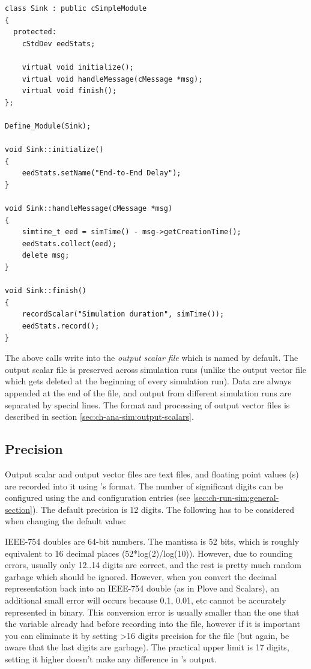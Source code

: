 \begin{verbatim}
class Sink : public cSimpleModule
{
  protected:
    cStdDev eedStats;

    virtual void initialize();
    virtual void handleMessage(cMessage *msg);
    virtual void finish();
};

Define_Module(Sink);

void Sink::initialize()
{
    eedStats.setName("End-to-End Delay");
}

void Sink::handleMessage(cMessage *msg)
{
    simtime_t eed = simTime() - msg->getCreationTime();
    eedStats.collect(eed);
    delete msg;
}

void Sink::finish()
{
    recordScalar("Simulation duration", simTime());
    eedStats.record();
}
\end{verbatim}

The above calls write into the \textit{output scalar file} which is named
 by default. The output scalar file is preserved across
simulation runs (unlike the output vector file which gets deleted
at the beginning of every simulation run).
Data are always appended at the end of the file, and
output from different simulation runs are separated by special lines.
The format and processing of output vector files is described in section
\ref{sec:ch-ana-sim:output-scalars}.


\subsection{Precision}
\label{sec:outputfile-precision}

Output scalar and output vector files are text files, and floating point
values (s) are recorded into it using 's
 format.
The number of significant digits can be configured using the
 and 
configuration entries (see \ref{sec:ch-run-sim:general-section}).
The default precision is 12 digits. The following has to be considered
when changing the default value:

IEEE-754 doubles are 64-bit numbers. The mantissa is 52 bits, which
is roughly equivalent to 16 decimal places (52*log(2)/log(10)).
However, due to rounding errors, usually only
12..14 digits are correct, and the rest is pretty much random garbage
which should be ignored. However, when you convert the decimal
representation back into an IEEE-754 double (as in Plove and Scalars),
an additional small error will occurs because 0.1, 0.01, etc cannot be
accurately represented in binary. This conversion error is usually
smaller than the one that the 
variable already had before recording into the file, however if
it is important you can eliminate it by setting >16 digits precision
for the file (but again, be aware that the last digits are garbage).
The practical upper limit is 17 digits, setting it higher
doesn't make any difference in 's output.

